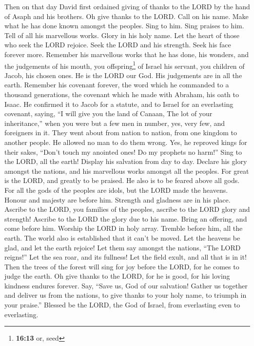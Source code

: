  Then on that day David first ordained giving of thanks to
the LORD by the hand of Asaph and his brothers.  Oh give
thanks to the LORD. Call on his name. Make what he has done known
amongst the peoples.  Sing to him. Sing praises to him.
Tell of all his marvellous works.  Glory in his holy
name. Let the heart of those who seek the LORD rejoice. 
Seek the LORD and his strength. Seek his face forever more.
 Remember his marvellous works that he has done, his
wonders, and the judgements of his mouth,  you
offspring\footnote{\textbf{16:13} or, seed} of Israel his servant, you
children of Jacob, his chosen ones.  He is the LORD our
God. His judgements are in all the earth.  Remember his
covenant forever, the word which he commanded to a thousand generations,
 the covenant which he made with Abraham, his oath to
Isaac.  He confirmed it to Jacob for a statute, and to
Israel for an everlasting covenant,  saying, ``I will
give you the land of Canaan, The lot of your inheritance,''
 when you were but a few men in number, yes, very few,
and foreigners in it.  They went about from nation to
nation, from one kingdom to another people.  He allowed
no man to do them wrong. Yes, he reproved kings for their sakes,
 ``Don't touch my anointed ones! Do my prophets no
harm!''  Sing to the LORD, all the earth! Display his
salvation from day to day.  Declare his glory amongst the
nations, and his marvellous works amongst all the peoples.
 For great is the LORD, and greatly to be praised. He
also is to be feared above all gods.  For all the gods of
the peoples are idols, but the LORD made the heavens. 
Honour and majesty are before him. Strength and gladness are in his
place.  Ascribe to the LORD, you families of the peoples,
ascribe to the LORD glory and strength!  Ascribe to the
LORD the glory due to his name. Bring an offering, and come before him.
Worship the LORD in holy array.  Tremble before him, all
the earth. The world also is established that it can't be moved.
 Let the heavens be glad, and let the earth rejoice! Let
them say amongst the nations, ``The LORD reigns!''  Let
the sea roar, and its fullness! Let the field exult, and all that is in
it!  Then the trees of the forest will sing for joy
before the LORD, for he comes to judge the earth.  Oh
give thanks to the LORD, for he is good, for his loving kindness endures
forever.  Say, ``Save us, God of our salvation! Gather us
together and deliver us from the nations, to give thanks to your holy
name, to triumph in your praise.''  Blessed be the LORD,
the God of Israel, from everlasting even to everlasting.

